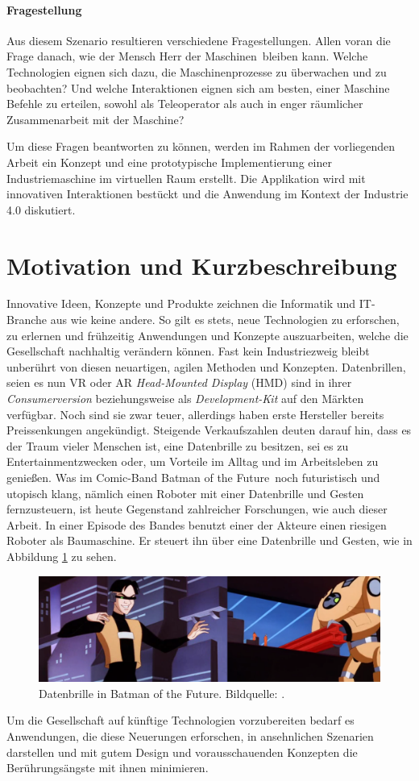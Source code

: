 \paragraph*{Fragestellung}
Aus diesem Szenario resultieren verschiedene Fragestellungen. Allen voran die Frage danach, wie der Mensch \frqq Herr der Maschinen\flqq\ bleiben kann. Welche Technologien eignen sich dazu, die Maschinenprozesse zu überwachen und zu beobachten? Und welche Interaktionen eignen sich am besten, einer Maschine Befehle zu erteilen, sowohl als Teleoperator als auch in enger räumlicher Zusammenarbeit mit der Maschine?

Um diese Fragen beantworten zu können, werden im Rahmen der vorliegenden Arbeit ein Konzept und eine prototypische Implementierung einer Industriemaschine im virtuellen Raum erstellt. Die Applikation wird mit innovativen Interaktionen bestückt und die Anwendung im Kontext der Industrie 4.0 diskutiert.

\section{Motivation und Kurzbeschreibung}
Innovative Ideen, Konzepte und Produkte zeichnen die Informatik und IT-Branche aus wie keine andere. So gilt es stets, neue Technologien zu erforschen, zu erlernen und frühzeitig Anwendungen und Konzepte auszuarbeiten, welche die Gesellschaft nachhaltig verändern können. Fast kein Industriezweig bleibt unberührt von diesen neuartigen, agilen Methoden und Konzepten. Datenbrillen, seien es nun VR oder AR \textit{Head-Mounted Display} (HMD) sind in ihrer \textit{Consumerversion} beziehungsweise als \textit{Development-Kit} auf den Märkten verfügbar. Noch sind sie zwar teuer, allerdings haben erste Hersteller bereits Preissenkungen angekündigt. Steigende Verkaufszahlen deuten darauf hin, dass es der Traum vieler Menschen ist, eine Datenbrille zu besitzen, sei es zu Entertainmentzwecken oder, um Vorteile im Alltag und im Arbeitsleben zu genießen. Was im Comic-Band \frqq Batman of the Future\flqq\ noch futuristisch und utopisch klang, nämlich einen Roboter mit einer Datenbrille und Gesten fernzusteuern, ist heute Gegenstand zahlreicher Forschungen, wie auch dieser Arbeit. In einer Episode des Bandes benutzt einer der Akteure einen riesigen Roboter als Baumaschine. Er steuert ihn über eine Datenbrille und Gesten, wie in Abbildung \ref{fig:BotF_Datenbrille} zu sehen.\begin{figure}[ht]
	\centering
	\includegraphics[width=.75\textwidth]{figuren/billy}
	\caption{Datenbrille in \frqq Batman of the Future\flqq. Bildquelle: \cite{billy}.}
	\label{fig:BotF_Datenbrille}
\end{figure} Um die Gesellschaft auf künftige Technologien vorzubereiten bedarf es Anwendungen, die diese Neuerungen erforschen, in ansehnlichen Szenarien darstellen und mit gutem Design und vorausschauenden Konzepten die Berührungsängste mit ihnen minimieren.

